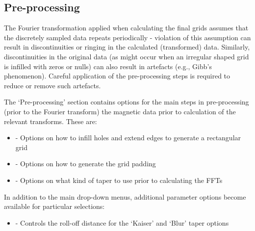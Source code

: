 \documentclass[letterpaper,10pt,english,openany,oneside]{sphinxmanual}
\begin{document}
\subsection{Pre-processing}
\label{\detokenize{content/getting_started/GUI_overview:pre-processing}}\label{\detokenize{content/getting_started/GUI_overview:preprocessing}}
The Fourier transformation applied when calculating the final grids assumes that the discretely sampled data repeats periodically - violation of this assumption can result in discontinuities or ringing in the calculated (transformed) data. Similarly, discontinuities in the original data (as might occur when an irregular shaped grid is infilled with zeros or nulls) can also result in artefacts (e.g., Gibb’s phenomenon). Careful application of the pre-processing steps is required to reduce or remove such artefacts.

The ‘Pre-processing’ section contains options for the main steps in pre-processing (prior to the Fourier transform) the magnetic data prior to calculation of the relevant transforms. These are:
\begin{itemize}
\item {} 
{\hyperref[\detokenize{content/preprocessing/extrapolation:extrapolation}]{}} - Options on how to infill holes and extend edges to generate a rectangular grid

\item {} 
{\hyperref[\detokenize{content/preprocessing/padding:padding}]{}} - Options on how to generate the grid padding

\item {} 
{\hyperref[\detokenize{content/preprocessing/tapering:tapering}]{}} - Options on what kind of taper to use prior to calculating the FFTs

\end{itemize}

In addition to the main drop-down menus, additional parameter options become available for particular selections:
\begin{itemize}
\item {} 
{\hyperref[\detokenize{content/preprocessing/tapering:taper-parameter}]{}} - Controls the roll-off distance for the ‘Kaiser’ and ‘Blur’ taper options

\end{itemize}
\end{document}
